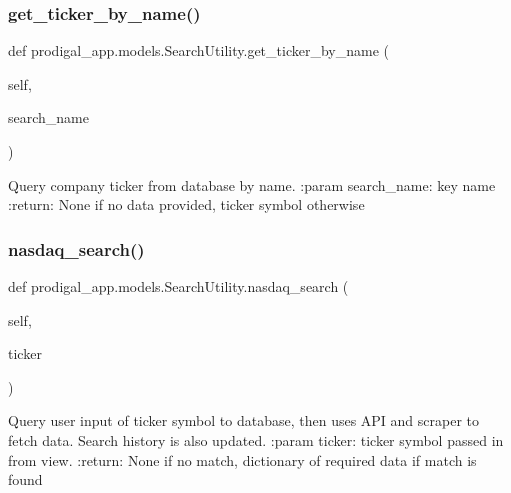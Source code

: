 \subsubsection{\texorpdfstring{get\+\_\+ticker\+\_\+by\+\_\+name()}{get\_ticker\_by\_name()}}
{\footnotesize\ttfamily def prodigal\+\_\+app.\+models.\+Search\+Utility.\+get\+\_\+ticker\+\_\+by\+\_\+name (\begin{DoxyParamCaption}\item[{}]{self,  }\item[{}]{search\+\_\+name }\end{DoxyParamCaption})}

\begin{DoxyVerb}Query company ticker from database by name.
:param search_name: key name
:return: None if no data provided, ticker symbol otherwise
\end{DoxyVerb}
 \mbox{\label{classprodigal__app_1_1models_1_1_search_utility_a2675d62b9de091c0eb4d0e800ed3a083}} 
\subsubsection{\texorpdfstring{nasdaq\+\_\+search()}{nasdaq\_search()}}
{\footnotesize\ttfamily def prodigal\+\_\+app.\+models.\+Search\+Utility.\+nasdaq\+\_\+search (\begin{DoxyParamCaption}\item[{}]{self,  }\item[{}]{ticker }\end{DoxyParamCaption})}

\begin{DoxyVerb}Query user input of ticker symbol to database,
then uses API and scraper to fetch data.
Search history is also updated.
:param ticker: ticker symbol passed in from view.
:return: None if no match,
dictionary of required data if match is found
\end{DoxyVerb}
 \mbox{\label{classprodigal__app_1_1models_1_1_search_utility_a82375f3ad93900b3e7e9e6a336406de7}} 
